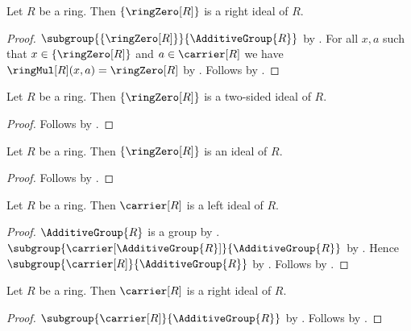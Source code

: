 \begin{theorem}\label{zero_is_right_ideal}
    Let $R$ be a ring.
    Then $\{\ringZero[R]\}$ is a right ideal of $R$.
\end{theorem}
\begin{proof}
    $\subgroup{\{\ringZero[R]\}}{\AdditiveGroup{R}}$ by
        .
    For all $x,a$ such that $x\in\{\ringZero[R]\}$ and
        $a\in\carrier[R]$ we have
        $\ringMul[R](x,a)=\ringZero[R]$ by
        .
    Follows by .
\end{proof}

\begin{theorem}\label{zero_is_two_sided_ideal}
    Let $R$ be a ring.
    Then $\{\ringZero[R]\}$ is a two-sided ideal of $R$.
\end{theorem}
\begin{proof}
    Follows by
        .
\end{proof}

\begin{corollary}\label{zero_is_ideal}
    Let $R$ be a ring.
    Then $\{\ringZero[R]\}$ is an ideal of $R$.
\end{corollary}
\begin{proof}
    Follows by .
\end{proof}

\begin{theorem}\label{unit_is_left_ideal}
    Let $R$ be a ring.
    Then $\carrier[R]$ is a left ideal of $R$.
\end{theorem}
\begin{proof}
    $\AdditiveGroup{R}$ is a group by
        .
    $\subgroup{\carrier[\AdditiveGroup{R}]}{\AdditiveGroup{R}}$ by
        .
    Hence $\subgroup{\carrier[R]}{\AdditiveGroup{R}}$ by
        .
    Follows by .
\end{proof}

\begin{theorem}\label{unit_is_right_ideal}
    Let $R$ be a ring.
    Then $\carrier[R]$ is a right ideal of $R$.
\end{theorem}
\begin{proof}
    $\subgroup{\carrier[R]}{\AdditiveGroup{R}}$ by
        .
    Follows by .
\end{proof}

